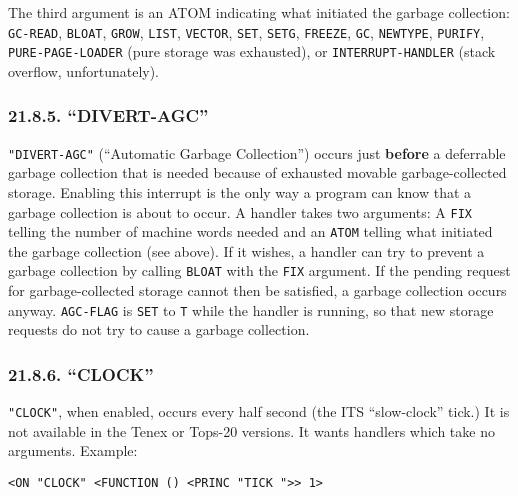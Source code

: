 \documentclass[a4paper,]{article}
\begin{document}
The third argument is an ATOM indicating what initiated the garbage collection: \texttt{GC-READ},
\texttt{BLOAT}, \texttt{GROW}, \texttt{LIST},
\texttt{VECTOR}, \texttt{SET}, \texttt{SETG},
\texttt{FREEZE}, \texttt{GC}, \texttt{NEWTYPE},
\texttt{PURIFY}, \texttt{PURE-PAGE-LOADER} (pure storage was
exhausted), or \texttt{INTERRUPT-HANDLER} (stack overflow, unfortunately).

\subsubsection{\texorpdfstring{21.8.5. ``DIVERT-AGC''}{21.8.5. DIVERT-AGC}}\label{divert-agc}

\texttt{"DIVERT-AGC"}  (``Automatic Garbage Collection'') occurs just \textbf{before}
a deferrable garbage collection that is needed because of exhausted movable garbage-collected storage. Enabling this
interrupt is the only way a program can know that a garbage collection is about to occur. A handler takes two arguments: A
\texttt{FIX} telling the number of machine words needed and an \texttt{ATOM} telling what initiated the garbage collection
(see above). If it wishes, a handler can try to prevent a garbage collection by calling \texttt{BLOAT} with the
\texttt{FIX} argument. If the pending request for garbage-collected storage cannot then be satisfied, a garbage collection
occurs anyway. \texttt{AGC-FLAG}  is \texttt{SET} to \texttt{T} while the handler is
running, so that new storage requests do not try to cause a garbage collection.

\subsubsection{\texorpdfstring{21.8.6. ``CLOCK''}{21.8.6. CLOCK}}\label{clock}

\texttt{"CLOCK"},  when enabled, occurs every half second (the ITS
``slow-clock'' tick.) It is not available in the Tenex or Tops-20 versions.
It wants handlers which take no arguments. Example:

\begin{verbatim}
<ON "CLOCK" <FUNCTION () <PRINC "TICK ">> 1>
\end{verbatim}
\end{document}
